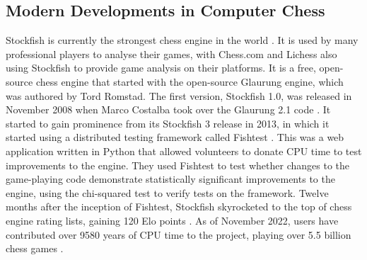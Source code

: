 \documentclass[%
 superscriptaddress,
showpacs,preprintnumbers,
 amsmath,
 amssymb,
 aps,
 pra,
showkeys,
onecolumn,
notitlepage,
11pt,
tightenlines      %
]{revtex4-1}
\begin{document}
\subsection{Modern Developments in Computer Chess}
Stockfish is currently the strongest chess engine in the world \cite{computerChessRatingLists}. It is used by many professional players to analyse their games, with Chess.com and Lichess also using Stockfish to provide game analysis on their platforms. It is a free, open-source chess engine that started with the open-source Glaurung engine, which was authored by Tord Romstad. The first version, Stockfish 1.0, was released in November 2008 when Marco Costalba took over the Glaurung 2.1 code \cite{aboutStockfish}. It started to gain prominence from its Stockfish 3 release in 2013, in which it started using a distributed testing framework called Fishtest \cite{fishtestDistributedTestingFramework}. This was a web application written in Python that allowed volunteers to donate CPU time to test improvements to the engine. They used Fishtest to test whether changes to the game-playing code demonstrate statistically significant improvements to the engine, using the chi-squared test to verify tests on the framework. Twelve months after the inception of Fishtest, Stockfish skyrocketed to the top of chess engine rating lists, gaining 120 Elo points \cite{stockfishRatingsAfterFishtest}. As of November 2022, users have contributed over 9580 years of CPU time to the project, playing over 5.5 billion chess games \cite{fishtestUsers}. 
\end{document}

